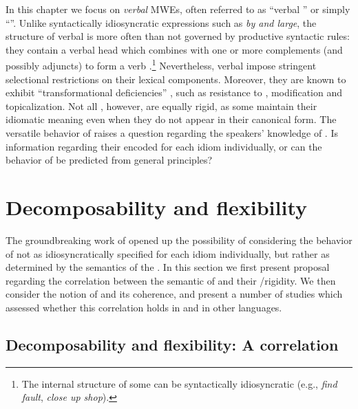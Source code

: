 \documentclass[output=paper]{langsci/langscibook}
\begin{document}
In this chapter we focus on \emph{verbal} MWEs, often referred to as ``verbal '' or simply ``''.
Unlike syntactically idiosyncratic expressions such as \textit{by and
  large}, the structure of verbal  is more often than not
governed by productive syntactic rules: they contain a verbal head
which combines with one or more complements (and possibly adjuncts) to
form a verb .\footnote{The internal structure of some  can be syntactically idiosyncratic (e.g., \textit{find fault}, \textit{close up shop}).}
Nevertheless, verbal  impose stringent selectional restrictions on
their lexical components. Moreover, they are known to exhibit
``transformational deficiencies'' \citep[111]{chafe1968idiomaticity},
such as resistance to , modification and topicalization. Not
all , however, are equally rigid, as some maintain their idiomatic
meaning even when they do not appear in their canonical form. The versatile behavior of  raises a question regarding the
speakers' knowledge of . Is information regarding their
 encoded for each idiom individually, or can the behavior
of  be predicted from general principles?


\section{Decomposability and flexibility}\largerpage[2]
\label{she:sec:decomp}

The groundbreaking work of \citet{nunberg94} opened up the possibility
of considering the behavior of  not as idiosyncratically specified for
each idiom individually, but rather as determined by the semantics of
the . In this section we first present  proposal regarding the correlation between the semantic  of  and their /rigidity. We then consider the notion of  and its coherence, and present a number of studies which assessed whether this correlation holds in  and in other languages.


\subsection{Decomposability and flexibility: A correlation}
\end{document}
